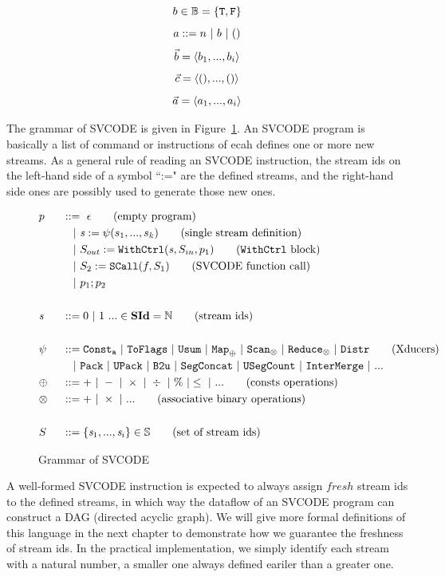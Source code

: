$$b \in \mathbb{B} = \{\mathtt{T},\mathtt{F} \}$$
$$ a ::= n \ | \ b \ | \ ()$$
$$\vec b = \langle b_1,...,b_i \rangle$$ 
$$\vec c = \langle (),...,() \rangle $$
$$\vec a = \langle a_1,...,a_i \rangle  $$ 

\hspace{1cm}



The grammar of SVCODE is given in Figure~\ref{fig-svcode1-gram}.
An SVCODE program is basically a list of command or instructions of ecah defines one or more new streams. 
As a general rule of reading an SVCODE instruction, the stream ids on the left-hand side of a symbol ``:=" are the defined streams, and the right-hand side ones are possibly used to generate those new ones.


\begin{figure}[!h] \large
	\begin{alignat*}{2}
	&p  && :: = \ \epsilon \tag{empty program}\\ 
	&   && \quad | \ \sdef{\s}{\psi(s_1,...,s_k)}  \tag{single stream definition}\\
	&   && \quad | \ \withctrl{\s}{p_1}{\Sin}{\Sout}  \tag{\wc block}\\
	&   && \quad | \ \scall{f}{\S_1}{\S_2} \tag{SVCODE function call}\\
	&   && \quad | \ p_1;p_2  \\
	\\
	&\s && ::= 0 \ | \ 1 \ ... \in \SId  = \mathbb{N}   \tag{stream ids}\\
	\\
	& \psi \ && ::= \consta{a} \ | \ \toflag  
	\ | \ \usum \ | \ \map{\oplus} \ | \ \genscan_{\otimes} \ | \ \genreduce_{\otimes} \ | \ \distr  \tag{Xducers}  \\
    &   && \quad | \ \pack \ | \ \upack \ | \ \bu \ | \ \segconcat \ | \ \usegcount \ | \ \intermerge \ | \ ...  \\
    & \oplus  \ && :: = + \ | \ - \ | \ \times \ |  \  \div \ | \ \% \ | \le \ | \ ... \tag{consts operations} \\
    & \otimes \ && :: = + \ | \ \times  \ | \ ...  \tag{associative binary operations} \\
	\\
	&  \S && ::= \{\s_1,..., \s_i\} \in \sset  \tag{set of stream ids}\\
	\end{alignat*}
	\caption{Grammar of SVCODE \label{fig-svcode1-gram}}
\end{figure}

A well-formed SVCODE instruction is expected to always assign $fresh$ stream ids to the defined streams, in which way the dataflow of an SVCODE program can construct a DAG (directed acyclic graph). 
We will give more formal definitions of this language in the next chapter
to demonstrate how we guarantee the freshness of stream ids. 
In the practical implementation, we simply identify each stream with a natural number, a smaller one always defined eariler than a greater one. 

